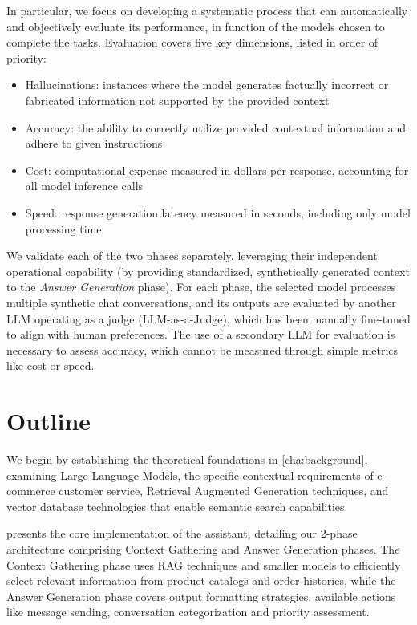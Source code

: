 
In particular, we focus on developing a systematic process that can automatically and objectively evaluate its performance, in function of the models chosen to complete the tasks. Evaluation covers five key dimensions, listed in order of priority:
\begin{itemize}
    \item Hallucinations: instances where the model generates factually incorrect or fabricated information not supported by the provided context
    \item Accuracy: the ability to correctly utilize provided contextual information and adhere to given instructions
    \item Cost: computational expense measured in dollars per response, accounting for all model inference calls
    \item Speed: response generation latency measured in seconds, including only model processing time
\end{itemize}
We validate each of the two phases separately, leveraging their independent operational capability (by providing standardized, synthetically generated context to the \textit{Answer Generation} phase).
For each phase, the selected model processes multiple synthetic chat conversations, and its outputs are evaluated by another LLM operating as a judge (LLM-as-a-Judge), which has been manually fine-tuned to align with human preferences.
The use of a secondary LLM for evaluation is necessary to assess accuracy, which cannot be measured through simple metrics like cost or speed.

\section{Outline}


We begin by establishing the theoretical foundations in \cref{cha:background}, examining Large Language Models, the specific contextual requirements of e-commerce customer service, Retrieval Augmented Generation techniques, and vector database technologies that enable semantic search capabilities.

 presents the core implementation of the assistant, detailing our 2-phase architecture comprising Context Gathering and Answer Generation phases. The Context Gathering phase uses RAG techniques and smaller models to efficiently select relevant information from product catalogs and order histories, while the Answer Generation phase covers output formatting strategies, available actions like message sending, conversation categorization and priority assessment.

